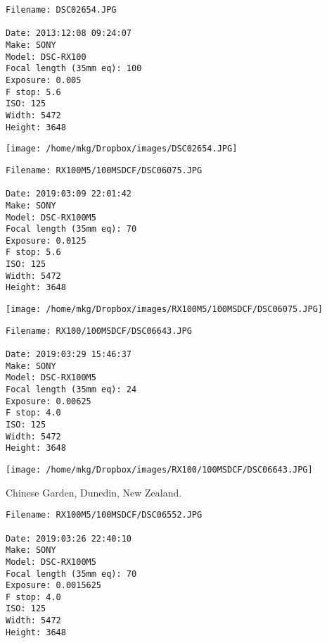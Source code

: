 \noindent 
\begin{lstlisting}
Filename: DSC02654.JPG

Date: 2013:12:08 09:24:07
Make: SONY
Model: DSC-RX100
Focal length (35mm eq): 100
Exposure: 0.005
F stop: 5.6
ISO: 125
Width: 5472
Height: 3648
\end{lstlisting}

\begin{landscape}

\texttt{[image: /home/mkg/Dropbox/images/DSC02654.JPG]}
\end{landscape}



\noindent 
\begin{lstlisting}
Filename: RX100M5/100MSDCF/DSC06075.JPG

Date: 2019:03:09 22:01:42
Make: SONY
Model: DSC-RX100M5
Focal length (35mm eq): 70
Exposure: 0.0125
F stop: 5.6
ISO: 125
Width: 5472
Height: 3648
\end{lstlisting}

\begin{landscape}

\texttt{[image: /home/mkg/Dropbox/images/RX100M5/100MSDCF/DSC06075.JPG]}
\end{landscape}



\noindent 
\begin{lstlisting}
Filename: RX100/100MSDCF/DSC06643.JPG

Date: 2019:03:29 15:46:37
Make: SONY
Model: DSC-RX100M5
Focal length (35mm eq): 24
Exposure: 0.00625
F stop: 4.0
ISO: 125
Width: 5472
Height: 3648
\end{lstlisting}

\begin{landscape}

\texttt{[image: /home/mkg/Dropbox/images/RX100/100MSDCF/DSC06643.JPG]}
\end{landscape}



\noindent Chinese Garden, Dunedin, New Zealand.
\begin{lstlisting}
Filename: RX100M5/100MSDCF/DSC06552.JPG

Date: 2019:03:26 22:40:10
Make: SONY
Model: DSC-RX100M5
Focal length (35mm eq): 70
Exposure: 0.0015625
F stop: 4.0
ISO: 125
Width: 5472
Height: 3648
\end{lstlisting}

